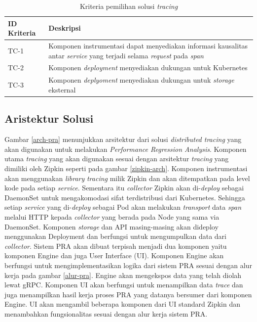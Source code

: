 \begin{small}
	\begin{longtable}{ | p{3cm} | p{10cm} |}
		\caption{Kriteria pemilihan solusi \textit{tracing}}
		\label{ch3-trace-crit}                                                           
		\\ \hline
		\centering\bfseries{ID Kriteria} & \centering\bfseries{Deskripsi} \tabularnewline \hline
		\endfirsthead
		TC-1 & Komponen instrumentasi dapat menyediakan informasi kausalitas antar \textit{service} yang terjadi selama \textit{request} pada \textit{span} \\ \hline
		TC-2 & Komponen \textit{deployment} menyediakan dukungan untuk Kubernetes \\ \hline
		TC-3 & Komponen \textit{deplyoment} menyediakan dukungan untuk \textit{storage} eksternal \\ \hline
	\end{longtable}
\end{small}

\subsection{Aristektur Solusi}

Gambar \ref{arch-pra} menunjukkan arsitektur dari solusi \textit{distributed tracing} yang akan digunakan untuk melakukan \textit{Performance Regression Analysis}. Komponen utama \textit{tracing} yang akan digunakan sesuai dengan arsitektur \textit{tracing} yang dimiliki oleh Zipkin seperti pada gambar \ref{zipkin-arch}. Komponen instrumentasi akan menggunakan \textit{library} \textit{tracing} milik Zipkin dan akan ditempatkan pada level kode pada setiap \textit{service}. Sementara itu \textit{collector} Zipkin akan di-\textit{deploy} sebagai DaemonSet untuk mengakomodasi sifat terdistribusi dari Kubernetes. Sehingga setiap \textit{service} yang di-\textit{deploy} sebagai Pod akan melakukan \textit{transport} data \textit{span} melalui HTTP kepada \textit{collector} yang berada pada Node yang sama via DaemonSet. Komponen \textit{storage} dan API masing-masing akan dideploy menggunakan Deployment dan berfungsi untuk mengumpulkan data dari \textit{collector}. Sistem PRA akan dibuat terpisah menjadi dua komponen yaitu komponen Engine dan juga User Interface (UI). Komponen Engine akan berfungsi untuk mengimplementasikan logika dari sistem PRA sesuai dengan alur kerja pada gambar \ref{alur-pra}. Engine akan mengekspos data yang telah diolah lewat gRPC. Komponen UI akan berfungsi untuk menampilkan data \textit{trace} dan juga menampilkan hasil kerja proses PRA yang datanya bersumer dari komponen Engine. UI akan mengambil beberapa komponen dari UI standard Zipkin dan menambahkan fungsionalitas sesuai dengan alur kerja sistem PRA.

